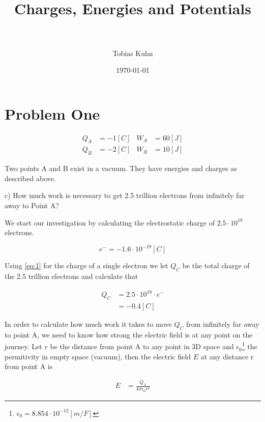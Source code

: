 \documentclass[paper=a4, fontsize=11pt]{scrartcl} %
\title{	
\normalfont \normalsize 
\horrule{0.5pt} \\[0.4cm] %
\huge Charges, Energies and Potentials\\ %
\horrule{2pt} \\[0.5cm] %
}
\author{Tobias Kuhn} %
\date{\normalsize\today} %
\numberwithin{equation}{section} %
\numberwithin{figure}{section} %
\numberwithin{table}{section} %
\begin{document}
\maketitle %


\section{ Problem One }

\begin{align} 
Q_A &= -1[C] & W_A &= 60[J] \\
Q_B &= -2[C] & W_B &= 10[J] 
\end{align}

Two points A and B exist in a vacuum. They have energies and charges as described above.

c) How much work is necessary to get 2.5 trillion electrons from infinitely far away to Point A?

We start our investigation by calculating the electrostatic charge of $2.5 \cdot 10^{18}$ electrons.

\begin{equation} \label{eq:1}
e^- = -1.6 \cdot 10^{-19} [C]
\end{equation}

Using \ref{eq:1} for the charge of a single electron we let $Q_C$ be the total charge of the 2.5 trillion electrons and calculate that

\begin{align} \label{eq:2}
Q_C &= 2.5 \cdot 10^{18} \cdot e^- \\ &= -0.4 [C]
\end{align}

In order to calculate how much work it takes to move $Q_C$ from infinitely far away to point A,
we need to know how strong the electric field is at any point on the journey. 
Let $r$ be the distance from point A to any point in 3D space and $\epsilon_0$\footnote{$\epsilon_0 = 8.854 \cdot 10 ^ {-12} [m/F] $} the permitivity in empty space (vacuum),
then the electric field $E$ at any distance r from point A is 

\begin{align} \label{eq:3}
E &= \frac{Q_A}{4 \pi \epsilon_0 r^2}
\end{align}
\end{document}
